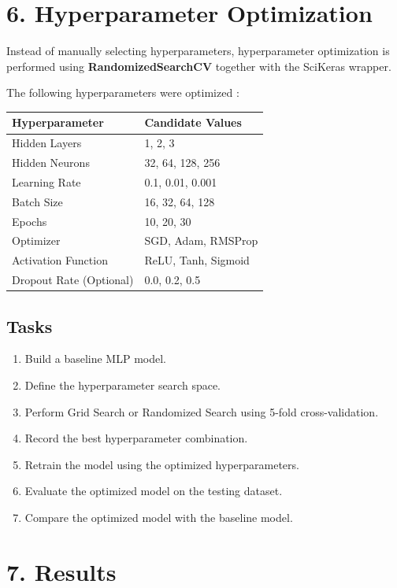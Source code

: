 \documentclass[11pt]{article}
\begin{document}
\section*{6. Hyperparameter Optimization}

Instead of manually selecting hyperparameters, hyperparameter optimization is performed using \textbf{RandomizedSearchCV}  together with the SciKeras wrapper.

The following hyperparameters were optimized :

\begin{center}
\begin{tabular}{|p{5cm}|p{7cm}|}
\hline
Hyperparameter & Candidate Values\\
\hline
Hidden Layers & 1, 2, 3\\
Hidden Neurons & 32, 64, 128, 256\\
Learning Rate & 0.1, 0.01, 0.001\\
Batch Size & 16, 32, 64, 128\\
Epochs & 10, 20, 30\\
Optimizer & SGD, Adam, RMSProp\\
Activation Function & ReLU, Tanh, Sigmoid\\
Dropout Rate (Optional) & 0.0, 0.2, 0.5\\
\hline
\end{tabular}
\end{center}

\subsection*{Tasks}

\begin{enumerate}
\item Build a baseline MLP model.
\item Define the hyperparameter search space.
\item Perform Grid Search or Randomized Search using 5-fold cross-validation.
\item Record the best hyperparameter combination.
\item Retrain the model using the optimized hyperparameters.
\item Evaluate the optimized model on the testing dataset.
\item Compare the optimized model with the baseline model.
\end{enumerate}

\section*{7. Results}
\end{document}
